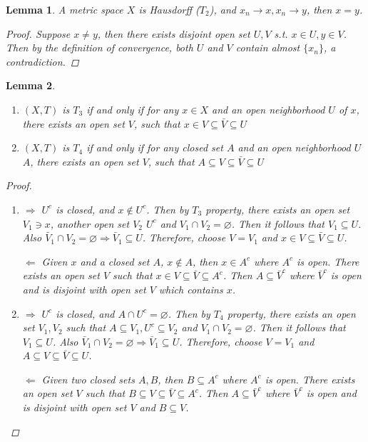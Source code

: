 \documentclass{article}
\def\emptyset{\varnothing}
\newtheorem{lemma}{Lemma}[section]
\begin{document}
\setcounter{lemma}{3}
\begin{lemma}
A metric space $X$ is Hausdorff ($T_2$), and $x_n\to x, x_n\to y$, then $x=y$.
\begin{proof}
Suppose $x\neq y$, then there exists disjoint open set $U,V$ s.t. $x\in U,y\in V$. Then by the definition of convergence, both $U$ and $V$ contain almost $\{x_n\}$, a contradiction.  
\end{proof}
\end{lemma}
\setcounter{lemma}{5}
\begin{lemma}\mbox{}
\begin{enumerate}[label=(\alph*)]
\item $(X,T)$ is $T_3$ if and only if for any $x\in X$ and an open neighborhood $U$ of $x$, there exists an open set $V$, such that $x\in V\subseteq \bar{V}\subseteq U$
\item $(X,T)$ is $T_4$ if and only if for any closed set $A$ and an open neighborhood $U$ $A$, there exists an open set $V$, such that $A\subseteq V\subseteq \bar{V}\subseteq U$
\end{enumerate}
\begin{proof}\mbox{}
\begin{enumerate}[label=(\alph*)]
\item $\Rightarrow$ $U^c$ is closed, and $x\notin U^c$. Then by $T_3$ property, there exists an open set $V_1\ni x$, another open set $V_2$  $U^c$ and $V_1\cap V_2 =\emptyset$. Then it follows that $V_1\subseteq U$. Also $\bar{V}_1 \cap V_2 = \emptyset \Rightarrow \bar{V}_1 \subseteq U$. Therefore, choose $V=V_1$ and $x\in V\subseteq \bar{V}\subseteq U$.

$\Leftarrow$ Given $x$ and a closed set $A$, $x\notin A$, then $x\in A^c$ where $A^c$ is open. There exists an open set $V$ such that $x\in V\subseteq \bar{V}\subseteq A^c$. Then $A\subseteq \bar{V}^c$ where $\bar{V}^c$ is open and is disjoint with open set $V$ which contains $x$.

\item $\Rightarrow$ $U^c$ is closed, and $A\cap U^c=\emptyset$. Then by $T_4$ property, there exists an open set $V_1,V_2$ such that $A\subseteq V_1,U^c\subseteq V_2$
 and $V_1\cap V_2 =\emptyset$. Then it follows that $V_1\subseteq U$. Also $\bar{V}_1 \cap V_2 = \emptyset \Rightarrow \bar{V}_1 \subseteq U$. Therefore, choose $V=V_1$ and $A\subseteq V\subseteq \bar{V}\subseteq U$.

$\Leftarrow$ Given two closed sets $A,B$, then $B\subseteq A^c$ where $A^c$ is open. There exists an open set $V$ such that $B\subseteq V\subseteq \bar{V}\subseteq A^c$. Then $A\subseteq \bar{V}^c$ where $\bar{V}^c$ is open and is disjoint with open set $V$ and $B\subseteq V$.
\end{enumerate}
\end{proof}
\end{lemma}
\end{document}

